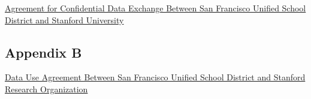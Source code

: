 \href{./appendix/sfusd_appendix_a.pdf}{Agreement for Confidential Data Exchange Between San Francisco Unified School District and Stanford University}

\hypertarget{sfusd-appendixb}{%
\subsection*{Appendix B}\label{sfusd-appendixb}}

\href{./appendix/sfusd_appendix_b.pdf}{Data Use Agreement Between San Francisco Unified School District and Stanford Research Organization}


